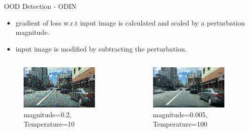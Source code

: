 \documentclass[10pt, aspectratio=169]{beamer}
\begin{document}
\begin{frame}[allowframebreaks]{OOD Detection - ODIN}
    \begin{itemize}
        \item gradient of loss w.r.t input image is calculated and scaled by a perturbation magnitude. 
        \item input image is modified by subtracting the perturbation.
    \end{itemize}
    \begin{columns}[c]
            \begin{column}{.33\textwidth}
            \begin{figure}
                \centering
                \includegraphics[width=0.9\textwidth]{images/image_0.2_10.png}
                \caption{magnitude=0.2, Temperature=10}
            \end{figure}      
            \end{column}
            \begin{column}{.33\textwidth}
            \begin{figure}
                \centering
                \includegraphics[width=0.9\textwidth]{images/image_0.005_1000.png}
                \caption{magnitude=0.005, Temperature=100}
            \end{figure}
            \end{column}


\end{columns}
\end{frame}
\end{document}
